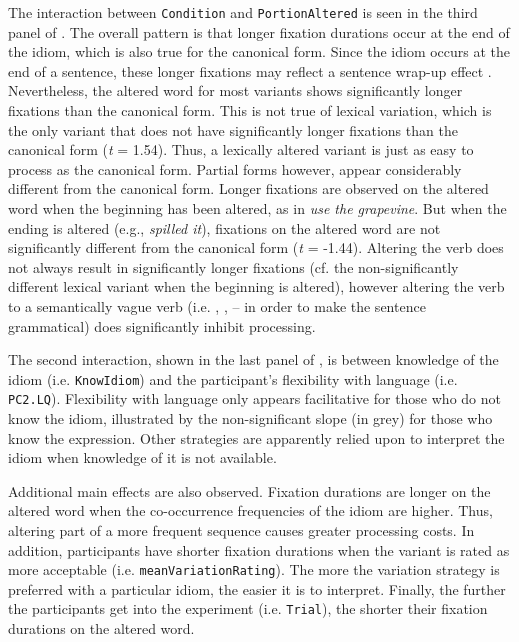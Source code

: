 \documentclass[output=paper,modfonts,nonflat]{langsci/langscibook}
\begin{document}
 
The interaction between \texttt{Condition} and \texttt{PortionAltered} is seen in the third panel of . The overall pattern is that longer fixation durations occur at the end of the idiom, which is also true for the canonical form. Since the idiom occurs at the end of a sentence, these longer fixations may reflect a sentence wrap-up effect \citep{RaynerEtAl2000, HirotaniEtAl2006}. Nevertheless, the altered word for most variants shows significantly longer fixations than the canonical form. This is not true of lexical variation, which is the only variant that does not have significantly longer fixations than the canonical form (\textit{t} = 1.54). Thus, a lexically altered variant is just as easy to process as the canonical form. Partial forms however, appear considerably different from the canonical form. Longer fixations are observed on the altered word when the beginning has been altered, as in \textit{use the grapevine}. But when the ending is altered (e.g., \textit{spilled it}), fixations on the altered word are not significantly different from the canonical form (\textit{t} = -1.44). 
Altering the verb does not always result in significantly longer fixations (cf. the non-significantly different lexical variant when the beginning is altered),
however altering the verb to a semantically vague verb (i.e. , ,  – in order to make the sentence grammatical) does significantly inhibit processing.



The second interaction, shown in the last panel of , is between knowledge of the idiom (i.e. \texttt{KnowIdiom}) and the participant's flexibility with language (i.e. \texttt{PC2.LQ}). Flexibility with language only appears facilitative for those who do not know the idiom, illustrated by the non-significant slope (in grey) for those who know the expression. Other strategies are apparently relied upon to interpret the idiom when knowledge of it is not available. 

Additional main effects are also observed. Fixation durations are longer on the altered word when the co-occurrence frequencies of the idiom are higher. Thus, altering part of a more frequent sequence causes greater processing costs. In addition, participants have shorter fixation durations when the variant is rated as more acceptable (i.e. \texttt{meanVariationRating}). The more the variation strategy is preferred with a particular idiom, the easier it is to interpret. Finally, the further the participants get into the experiment (i.e. \texttt{Trial}), the shorter their fixation durations on the altered word. 
\end{document}
